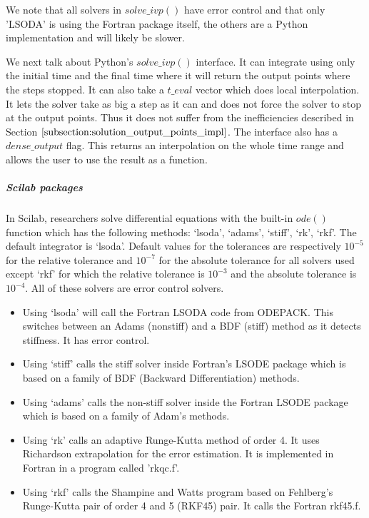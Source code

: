 We note that all solvers in $solve\_ivp()$ have error control and that only 'LSODA' is using the Fortran package itself, the others are a Python implementation and will likely be slower.

We next talk about Python's $solve\_ivp()$ interface. It can integrate using only the initial time and the final time where it will return the output points where the steps stopped. It can also take a $t\_eval$ vector which does local interpolation. It lets the solver take as big a step as it can and does not force the solver to stop at the output points. Thus it does not suffer from the inefficiencies described in Section $\ref{subsection:solution_output_points_impl}$. The interface also has a $dense\_output$ flag. This returns an interpolation on the whole time range and allows the user to use the result as a function.

\subparagraph{Scilab packages}
In Scilab, researchers solve differential equations with the built-in $ode()$ function which has the following methods: `lsoda', `adams', `stiff', `rk', `rkf'. The default integrator is `lsoda'.
Default values for the tolerances are respectively $10^{-5}$ for the relative tolerance and $10^{-7}$ for the absolute tolerance for all solvers used except `rkf' for which the relative tolerance is $10^{-3}$ and the absolute tolerance is $10^{-4}$. All of these solvers are error control solvers.

\begin{itemize}
\item Using `lsoda' will call the Fortran LSODA code from ODEPACK. This switches between an Adams (nonstiff) and a BDF (stiff) method as it detects stiffness. It has error control.
\item Using `stiff' calls the stiff solver inside Fortran's LSODE package which is based on a family of BDF (Backward Differentiation) methods.
\item Using `adams' calls the non-stiff solver inside the Fortran LSODE package which is based on a family of Adam's methods.
\item Using `rk' calls an adaptive Runge-Kutta method of order 4. It uses Richardson extrapolation for the error estimation. It is implemented in Fortran in a program called 'rkqc.f'.
\item Using `rkf' calls the Shampine and Watts program based on Fehlberg's Runge-Kutta pair of order 4 and 5 (RKF45) pair. It calls the Fortran rkf45.f.
\end{itemize}

